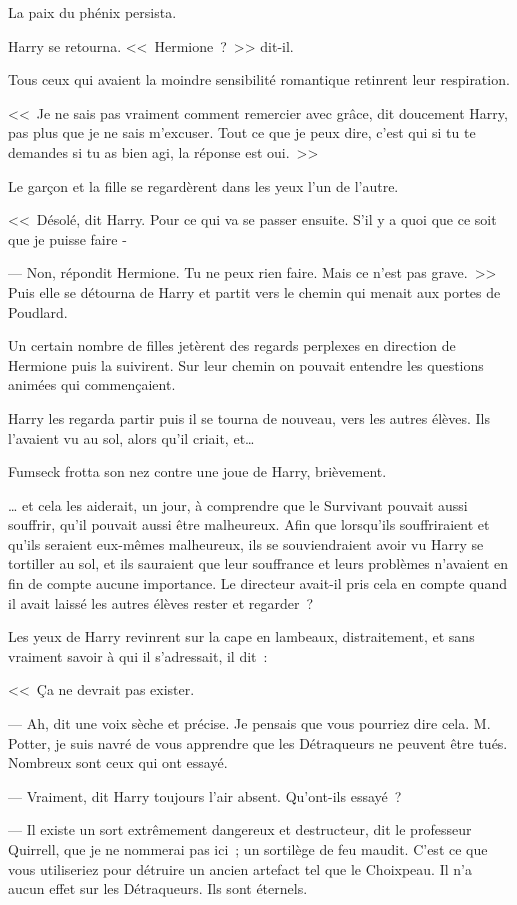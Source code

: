 La paix du phénix persista.

Harry se retourna. <<~Hermione~?~>> dit-il.

Tous ceux qui avaient la moindre sensibilité romantique retinrent leur respiration.

<<~Je ne sais pas vraiment comment remercier avec grâce, dit doucement Harry, pas plus que je ne sais m'excuser. Tout ce que je peux dire, c'est qui si tu te demandes si tu as bien agi, la réponse est oui.~>>

Le garçon et la fille se regardèrent dans les yeux l'un de l'autre.

<<~Désolé, dit Harry. Pour ce qui va se passer ensuite. S'il y a quoi que ce soit que je puisse faire -

--- Non, répondit Hermione. Tu ne peux rien faire. Mais ce n'est pas grave.~>> Puis elle se détourna de Harry et partit vers le chemin qui menait aux portes de Poudlard.

Un certain nombre de filles jetèrent des regards perplexes en direction de Hermione puis la suivirent. Sur leur chemin on pouvait entendre les questions animées qui commençaient.

Harry les regarda partir puis il se tourna de nouveau, vers les autres élèves. Ils l'avaient vu au sol, alors qu'il criait, et…

Fumseck frotta son nez contre une joue de Harry, brièvement.

… et cela les aiderait, un jour, à comprendre que le Survivant pouvait aussi souffrir, qu'il pouvait aussi être malheureux. Afin que lorsqu'ils souffriraient et qu'ils seraient eux-mêmes malheureux, ils se souviendraient avoir vu Harry se tortiller au sol, et ils sauraient que leur souffrance et leurs problèmes n'avaient en fin de compte aucune importance. Le directeur avait-il pris cela en compte quand il avait laissé les autres élèves rester et regarder~?

Les yeux de Harry revinrent sur la cape en lambeaux, distraitement, et sans vraiment savoir à qui il s'adressait, il dit~:

<<~Ça ne devrait pas exister.

--- Ah, dit une voix sèche et précise. Je pensais que vous pourriez dire cela. M. Potter, je suis navré de vous apprendre que les Détraqueurs ne peuvent être tués. Nombreux sont ceux qui ont essayé.

--- Vraiment, dit Harry toujours l'air absent. Qu'ont-ils essayé~?

--- Il existe un sort extrêmement dangereux et destructeur, dit le professeur Quirrell, que je ne nommerai pas ici~; un sortilège de feu maudit. C'est ce que vous utiliseriez pour détruire un ancien artefact tel que le Choixpeau. Il n'a aucun effet sur les Détraqueurs. Ils sont éternels.

